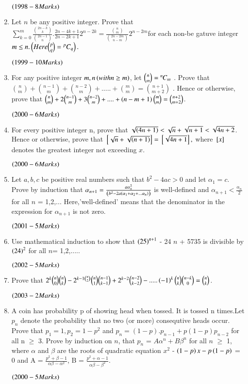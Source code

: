 \documentclass[journal,12pt,twocolumn]{IEEEtran}
\theoremstyle{remark}
\begin{document}
\begin{enumerate}[start=16]
$\hfill\textcolor{black}{\brak{1998-8 Marks} }$
\item 
Let $n$ be any positive integer. Prove that $\sum\limits^{m}_{k=0}\frac{\binom{2n-k}{k}}{\binom{2n-1}{n}}.\frac{2n-4k+1}{2n-2k+1}2^{n-2k}= \frac{\binom{n}{m}}{\binom{2n-2m}{n-m} } 2^{n-2m}$for each non-be gatuve integer $m\leq n. \left(Here \binom{p}{q} = {}^pC_q\right).$

$\hfill\textcolor{black}{\brak{1999-10 Marks} }$
\item
For any positive integer $m,n\left(with n \geq m\right)$, let $\binom{n}{m} ={{}^{n}\mkern-1muC_{m}}$ . Prove that $\binom{n}{m} + \binom{n-1}{m} + \binom{n-2}{m} + ..... + \binom{m}{m} = \binom{n+1}{m+2}$ . Hence or otherwise, prove that $\binom{n}{m} +2\binom{n-1}{m} +3\binom{n-2}{m}+....+ \left(n-m+1\right) \binom{m}{m} = \binom{n+2}{m+2}$.

$\hfill\textcolor{black}{\brak{2000-6 Marks} }$
\item
For every positive integer n, prove that $\sqrt{\left(4n+1\right)} < \sqrt{n} +\sqrt{n+1} < \sqrt{4n+2}$. Hence or otherwise, prove that ${}\left[\sqrt{n} + \sqrt{\left(n+1\right)}\right]= {}\left[\sqrt{4n+1}\right],$ where ${}\left[x\right]$ denotes the greatest integer not exceeding $x$.

$\hfill\textcolor{black}{\brak{2000-6 Marks} }$
\item
Let $a,b,c$ be positive real numbers such that $b^2 - 4ac > 0$ and let $\alpha_1 = c$. Prove by induction that $\alpha_{n+1} = \frac{a \alpha_{n}^2}{\left(b^2 - 2a \left(\alpha_1 + \alpha_2 + ... \alpha_n\right)\right)}$ is well-defined and $\alpha_{n+1} < \frac{\alpha_n}{2}$ for all $n$ = 1,2,...
\lbrak{}Here,'well-defined' means that the denominator in the expression for $\alpha_{n+1}$ is not zero.\rbrak{}

$\hfill\textcolor{black}{\brak{2001-5 Marks} }$
\item
Use mathematical induction to show that $\left(25\right)^{n+1}$ - 24 $n$ + 5735 is divisible by $\left(24\right)^2$ for all $n$= 1,2,.....

$\hfill\textcolor{black}{\brak{2002-5 Marks} }$
\item 
Prove that $2^k \binom{n}{0}\binom{n}{k} - 2^{k-1\binom{n}{2}} \binom{n}{1} \binom{n-1}{k-1} + 2^{k-2}\binom{n-2}{k-2} - .....\left(-1\right)^k \binom{n}{k}\binom{n-k}{0} = \binom{n}{k}$.

$\hfill\textcolor{black}{\brak{2003-2 Marks} }$\item
A coin has probability p of showing head when tossed. It is tossed n times.Let $p_n$ denote the probability that no two (or more) consequtive heads occur. Prove that $p_1=1 , p_2=1-p^2$ and $p_n = (1-p).p_{n-1} + p(1-p)p_{n-2}$ for all n $\geq$ 3. Prove by induction on $n$, that $p_n$ = $A\alpha^n + B\beta^n$ for all $n$ $\geq$ 1, where $\alpha$ and $\beta$ are the roots of quadratic equation $x^2$ - $\left(1-p\right)x - p\left(1-p\right)$ = 0 and A = $\frac{p^2 + \beta -1}{\alpha\beta-\alpha^2}$, B = $\frac{p^2 + \alpha -1}{\alpha\beta - \beta^2}$.

$\hfill\textcolor{black}{\brak{2000-5 Marks} }$



\end{enumerate}
\end{document}
